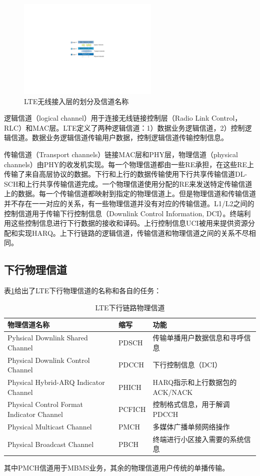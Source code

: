 \documentclass[10pt,a4paper,UTF8]{article}
\begin{document}
\begin{figure}[htb]
\centering
\includegraphics[width=0.6\textwidth]{../../img/20151101ltechannel.pdf}
\caption{\label{fig:orgparagraph5}
LTE无线接入层的划分及信道名称}
\end{figure}

逻辑信道（logical channel）用于连接无线链接控制层（Radio Link Control，RLC）和MAC层。LTE定义了两种逻辑信道：1）数据业务逻辑信道，2）控制逻辑信道。数据业务逻辑信道传输用户数据，控制逻辑信道传输控制信息。

传输信道（Transport channels）链接MAC层和PHY层，物理信道（physical channels）由PHY的收发机实现。每一个物理信道都由一些RE承担，在这些RE上传输了来自高层协议的数据。下行和上行的数据传输使用下行共享传输信道DL-SCH和上行共享传输信道完成。一个物理信道使用分配的RE来发送特定传输信道上的数据。每一个传输信道都映射到指定的物理信道上。但是物理信道和传输信道并不存在一一对应的关系，有一些物理信道并没有对应的传输信道。L1/L2之间的控制信道用于传输下行控制信息（Downlink Control Information, DCI）。终端利用这些控制信息进行下行数据的接收和译码。上行控制信息UCI被用来提供资源分配和实现HARQ。上下行链路的逻辑信道，传输信道和物理信道之间的关系不尽相同。
\subsection{下行物理信道}
\label{sec:orgheadline16}


表\ref{tab:orgtable3}给出了LTE下行物理信道的名称和各自的任务：
\begin{table}[htb]
\caption{\label{tab:orgtable3}
LTE下行链路物理信道}
\centering
\begin{tabular}{lll}
\hline
物理信道名称 & 缩写 & 功能\\
\hline
Pyhsical Downlink Shared Channel & PDSCH & 传输单播用户数据信息和寻呼信息\\
Physical Downlink Control Channel & PDCCH & 下行控制信息（DCI）\\
Physical Hybrid-ARQ Indicator Channel & PHICH & HARQ指示和上行数据包的ACK/NACK\\
Physical Control Format Indicator Channel & PCFICH & 控制格式信息，用于解调PDCCH\\
Physical Multicast Channel & PMCH & 多媒体广播单频网络操作\\
Physical Broadcast Channel & PBCH & 终端进行小区接入需要的系统信息\\
\hline
\end{tabular}
\end{table}
其中PMCH信道用于MBMS业务，其余的物理信道用户传统的单播传输。
\end{document}
